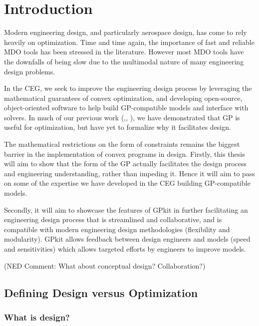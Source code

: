 \chapter{Introduction}

Modern engineering design, and particularly aerospace design, has come to rely
heavily on optimization. Time and time again, the importance of fast and
reliable MDO tools has been stressed in the literature. However most MDO tools
have the downfalls of being slow due to the multimodal nature of many
engineering design problems.
	
In the \gls{CEG}, we seek to improve the engineering design process by
leveraging the mathematical guarantees of convex optimization, and developing
open-source, object-oriented software to help build GP-compatible models and
interface with solvers. In much of our previous work
(\cite{gp_ac_design},\cite{SP_ac_design}, \cite{turbofan}), we have demonstrated that
\gls{GP} is useful for optimization, but have yet to formalize why it
facilitates design.
 
The mathematical restrictions on the form of constraints remains the biggest
barrier in the implementation of convex programs in design. Firstly, this thesis
will aim to show that the form of the GP actually facilitates the design process
and engineering understanding, rather than impeding it. Hence it will aim to
pass on some of the expertise we have developed in the \gls{CEG} building
\gls{GP}-compatible models.

Secondly, it will aim to showcase the features of GPkit in further facilitating
an engineering design process that is streamlined and collaborative, and is
compatible with modern engineering design methodologies (flexibility and
modularity). GPkit allows feedback between design engineers and models (speed
and sensitivities) which allows targeted efforts by engineers to improve models.

(NED Comment: What about conceptual design? Collaboration?)

\section{Defining Design versus Optimization} \label{sec:DesVsOpt}

\subsection{What is design?}

